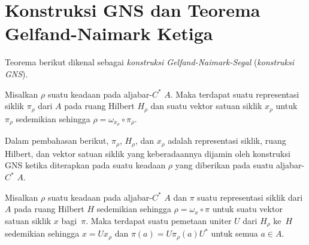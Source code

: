 \section{Konstruksi GNS dan Teorema Gelfand-Naimark Ketiga}
Teorema berikut dikenal sebagai
\emph{konstruksi Gelfand-Naimark-Segal} (\emph{konstruksi GNS}).

\begin{thm}\label{0029} Misalkan $\rho$ suatu keadaan pada aljabar-$C^*$ $A$. Maka
terdapat suatu representasi siklik $\pi_\rho$ dari $A$ pada ruang Hilbert $H_\rho$ dan suatu
vektor satuan siklik $x_\rho$ untuk $\pi_\rho$ sedemikian sehingga $\rho = \omega_{x_\rho} \circ
\pi_\rho$.
\end{thm}

\begin{notn} Dalam pembahasan berikut, $\pi_\rho$, $H_\rho$, dan $x_\rho$ adalah representasi
siklik, ruang Hilbert, dan vektor satuan siklik yang keberadaannya dijamin oleh konstruksi
GNS ketika diterapkan pada suatu keadaan $\rho$ yang diberikan pada suatu aljabar-$C^*$ $A$.
\end{notn}

\begin{prop} Misalkan $\rho$ suatu keadaan pada aljabar-$C^*$ $A$ dan $\pi$ suatu representasi siklik
dari $A$ pada ruang Hilbert $H$ sedemikian sehingga $\rho = \omega_x \circ \pi$ untuk suatu vektor
satuan siklik $x$ bagi~$\pi$. Maka terdapat suatu pemetaan uniter $U$ dari $H_\rho$ ke~$H$ sedemikian sehingga
$x = Ux_\rho$ dan $\pi(a) = U \pi_\rho(a) U^*$ untuk semua $a \in A$.
\end{prop}

